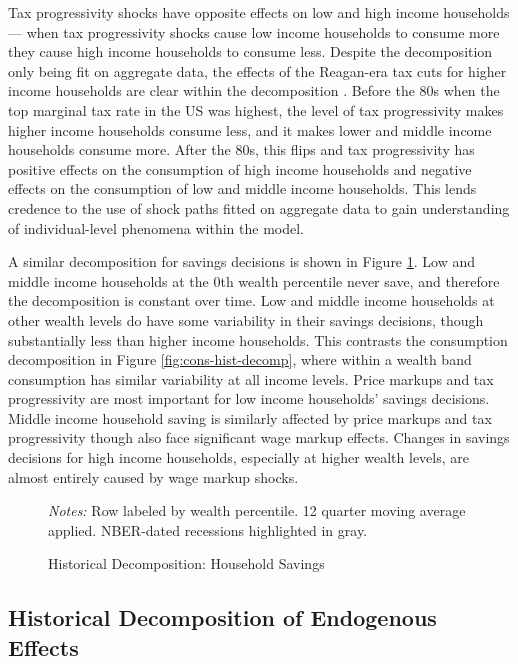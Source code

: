 Tax progressivity shocks have opposite effects on low and high income households --- when tax progressivity shocks cause low income households to consume more they cause high income households to consume less. Despite the decomposition only being fit on aggregate data, the effects of the Reagan-era tax cuts for higher income households are clear within the decomposition \autocite{prasad2012popular}. Before the 80s when the top marginal tax rate in the US was highest, the level of tax progressivity makes higher income households consume less, and it makes lower and middle income households consume more. After the 80s, this flips and tax progressivity has positive effects on the consumption of high income households and negative effects on the consumption of low and middle income households. This lends credence to the use of shock paths fitted on aggregate data to gain understanding of individual-level phenomena within the model.

A similar decomposition for savings decisions is shown in Figure \ref{fig:sav-hist-decomp}. Low and middle income households at the 0th wealth percentile never save, and therefore the decomposition is constant over time. Low and middle income households at other wealth levels do have some variability in their savings decisions, though substantially less than higher income households. This contrasts the consumption decomposition in Figure \ref{fig:cons-hist-decomp}, where within a wealth band consumption has similar variability at all income levels. Price markups and tax progressivity are most important for low income households' savings decisions. Middle income household saving is similarly affected by price markups and tax progressivity though also face significant wage markup effects. Changes in savings decisions for high income households, especially at higher wealth levels, are almost entirely caused by wage markup shocks.

\begin{figure}[t!]
    \centering
    \caption{Historical Decomposition: Household Savings}
    
    {\scriptsize \emph{Notes:} Row labeled by wealth percentile. 12 quarter moving average applied. NBER-dated recessions highlighted in gray.}
    \label{fig:sav-hist-decomp}
\end{figure}


\subsection{Historical Decomposition of Endogenous Effects}

